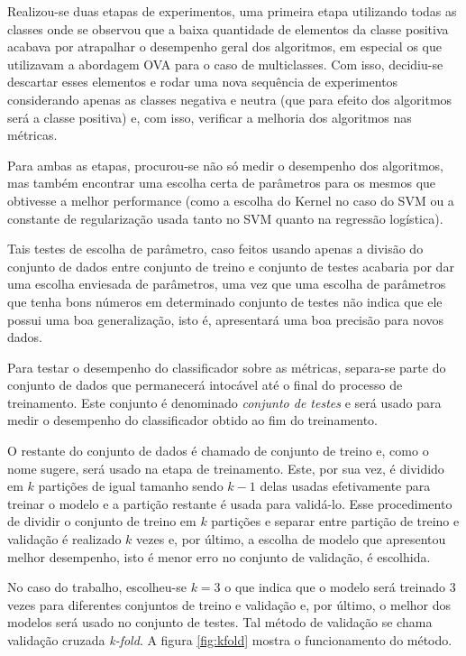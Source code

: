 Realizou-se duas etapas de experimentos, uma primeira etapa utilizando todas as classes onde se
observou que a baixa quantidade de elementos da classe positiva acabava por atrapalhar o desempenho
geral dos algoritmos, em especial os que utilizavam a abordagem OVA para o caso de multiclasses.
Com isso, decidiu-se descartar esses elementos e rodar uma nova sequência de experimentos 
considerando apenas as classes negativa e neutra (que para efeito dos algoritmos será a classe 
positiva) e, com isso, verificar a melhoria dos algoritmos nas métricas.

Para ambas as etapas, procurou-se não só medir o desempenho dos algoritmos, mas também encontrar
uma escolha certa de parâmetros para os mesmos que obtivesse a melhor performance (como a escolha
do Kernel no caso do SVM ou a constante de regularização usada tanto no SVM quanto na regressão
logística).

Tais testes de escolha de parâmetro, caso feitos usando apenas a divisão do conjunto de dados entre
conjunto de treino e conjunto de testes acabaria por dar uma escolha enviesada de parâmetros, uma
vez que uma escolha de parâmetros que tenha bons números em determinado conjunto de testes não
indica que ele possui uma boa generalização, isto é, apresentará uma boa precisão para novos dados.

Para testar o desempenho do classificador sobre as métricas, separa-se parte do conjunto de dados
que permanecerá intocável até o final do processo de treinamento. 
Este conjunto é denominado \textit{conjunto de testes} e será usado para medir o desempenho do
classificador obtido ao fim do treinamento.

O restante do conjunto de dados é chamado de conjunto de treino e, como o nome sugere, será usado
na etapa de treinamento. Este, por sua vez, é dividido em $k$ partições de igual tamanho
sendo $k - 1$ delas usadas efetivamente para treinar o modelo e a partição restante é usada para
validá-lo. Esse procedimento de dividir o conjunto de treino em $k$ partições e separar entre partição
de treino e validação é realizado $k$ vezes e, por último, a escolha de modelo que apresentou melhor
desempenho, isto é menor erro no conjunto de validação, é escolhida. 

No caso do trabalho, escolheu-se $k = 3$ o que indica que o modelo será 
treinado 3 vezes para diferentes conjuntos de treino e validação e, por último, o melhor dos modelos
será usado no conjunto de testes.
Tal método de validação se chama validação cruzada \textit{k-fold}. A figura \ref{fig:kfold} mostra o funcionamento do
método\cite{cross-validation}.

